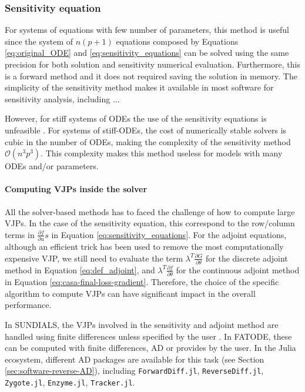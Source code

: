 \subsubsection{Sensitivity equation}
\label{section:computing-sensitivity-equations}

For systems of equations with few number of parameters, this method is useful since the system of $n(p+1)$ equations composed by Equations \eqref{eq:original_ODE} and \eqref{eq:sensitivity_equations} can be solved using the same precision for both solution and sensitivity numerical evaluation. 
Furthermore, this is a forward method and it does not required saving the solution in memory. 
The simplicity of the sensitivity method makes it available in most software for sensitivity analysis, including ... 

However, for stiff systems of ODEs the use of the sensitivity equations is unfeasible \cite{kim_stiff_2021}.
For systems of stiff-ODEs, the cost of numerically stable solvers is cubic in the number of ODEs, making the complexity of the sensitivity method $\mathcal{O}(n^3p^3)$. 
This complexity makes this method useless for models with many ODEs and/or parameters. 

\paragraph{Computing VJPs inside the solver}

All the solver-based methods has to faced the challenge of how to compute large VJPs. 
In the case of the sensitivity equation, this correspond to the row/column terms in $\frac{\partial f}{\partial u} s $ in Equation \eqref{eq:sensitivity_equations}.
For the adjoint equations, although an efficient trick has been used to remove the most computationally expensive VJP, we still need to evaluate the term $\lambda^T \frac{\partial G}{\partial \theta}$ for the discrete adjoint method in Equation \eqref{eq:def_adjoint}, and $\lambda^T \frac{\partial f}{\partial \theta}$ for the continuous adjoint method in Equation \eqref{eq:casa-final-loss-gradient}. 
Therefore, the choice of the specific algorithm to compute VJPs can have significant impact in the overall performance. 

In SUNDIALS, the VJPs involved in the sensitivity and adjoint method are handled using finite differences unless specified by the user \cite{SUNDIALS-hindmarsh2005sundials}.
In FATODE, these can be computed with finite differences, AD or provides by the user.
In the Julia ecosystem, different AD packages are available for this task (see Section \ref{sec:software-reverse-AD}), including \texttt{ForwardDiff.jl}, \texttt{ReverseDiff.jl}, \texttt{Zygote.jl}\cite{Innes_Zygote}, \texttt{Enzyme.jl}\cite{moses_Enzyme}, \texttt{Tracker.jl}.

